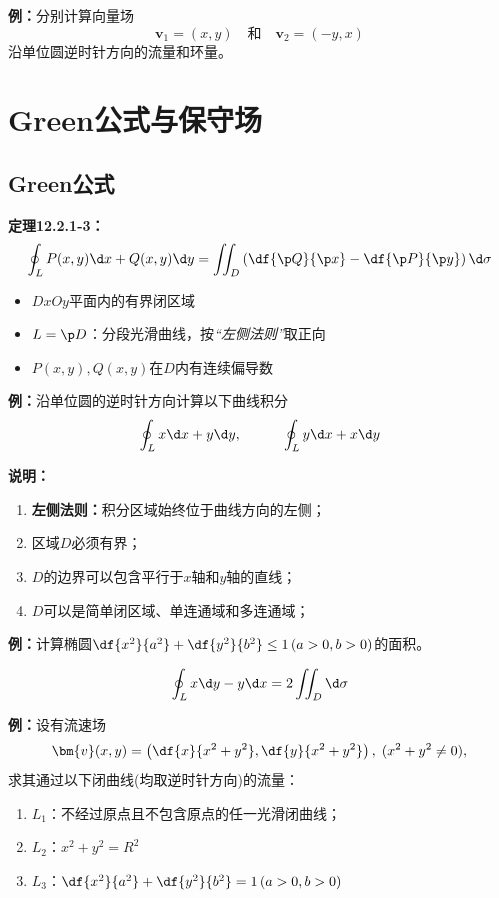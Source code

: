 {\bf 例：}分别计算向量场
$$\bm{v}_1=(x,y)\quad\mbox{和}\quad \bm{v}_2=(-y,x)$$
沿单位圆逆时针方向的流量和环量。

\section{Green公式与保守场}

\subsection{Green公式}

{\bf 定理12.2.1-3：}$$\oint_LP(x,y)\d x+Q(x,y)\d y=\iint_D\left(
\df{\p Q}{\p x}-\df{\p P}{\p y}\right)\d\sigma$$

\begin{itemize}
  \item $D$$xOy$平面内的有界闭区域
  \item $L=\p D$：分段光滑曲线，按{\it “左侧法则”}取正向
  \item $P(x,y),Q(x,y)$在$D$内有连续偏导数
\end{itemize}

{\bf 例：}沿单位圆的逆时针方向计算以下曲线积分
$$\oint_Lx\d x+y\d y,\hspace{3em}\oint_Ly\d x+x\d y$$

{\bf 说明：}
\begin{enumerate}[(1)]
  \setlength{\itemindent}{1cm}
  \item {\bf 左侧法则：}积分区域始终位于曲线方向的左侧；
  \item 区域$D$必须有界；
  \item $D$的边界可以包含平行于$x$轴和$y$轴的直线；
  \item $D$可以是简单闭区域、单连通域和多连通域；
\end{enumerate}

{\bf 例：}计算椭圆$\df{x^2}{a^2}+\df{y^2}{b^2}\leq 1\,(a>0,b>0)$的面积。

$$\oint_L x\d y-y\d x=2\iint_D\d\sigma$$

{\bf 例：}设有流速场
$$\bm{v}(x,y)=\left(\df{x}{x^2+y^2},
\df{y}{x^2+y^2}\right),\;(x^2+y^2\ne 0),$$
求其通过以下闭曲线(均取逆时针方向)的流量：
\begin{enumerate}
  \setlength{\itemindent}{1cm}
  \item $L_1$：不经过原点且不包含原点的任一光滑闭曲线；
  \item $L_2$：$x^2+y^2=R^2$
  \item $L_3$：$\df{x^2}{a^2}+\df{y^2}{b^2}=1\,(a>0,b>0)$
\end{enumerate}

